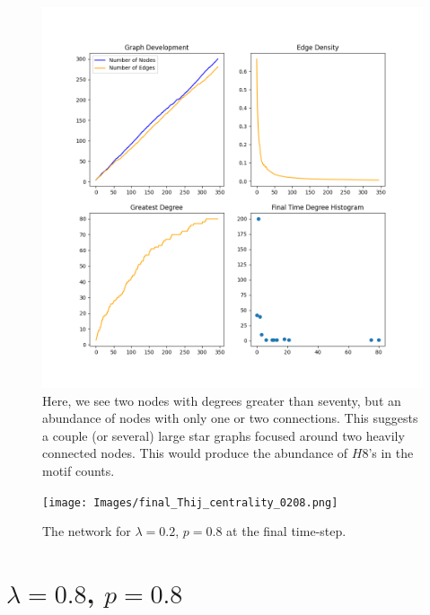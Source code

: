 \begin{figure}[h!]
    \includegraphics[width=14cm]{Images/twitter_sim_stats_3_0.2_0.8.png}
    \centering
    \caption{Here, we see two nodes with degrees greater than seventy,
    but an abundance of nodes with only one or two connections. This suggests
     a couple (or several) large star graphs focused around two heavily connected nodes. This 
    would produce the abundance of $H8$'s in the motif counts.}
    \label{fig:twittersim28}
\end{figure}


\begin{figure}[h!]
    \texttt{[image: Images/final\_Thij\_centrality\_0208.png]}
    \centering
    \caption{The network for $\lambda=0.2$, $p=0.8$ at the final time-step.}
\end{figure}

\clearpage

\section{$\lambda=0.8$, $p=0.8$}

